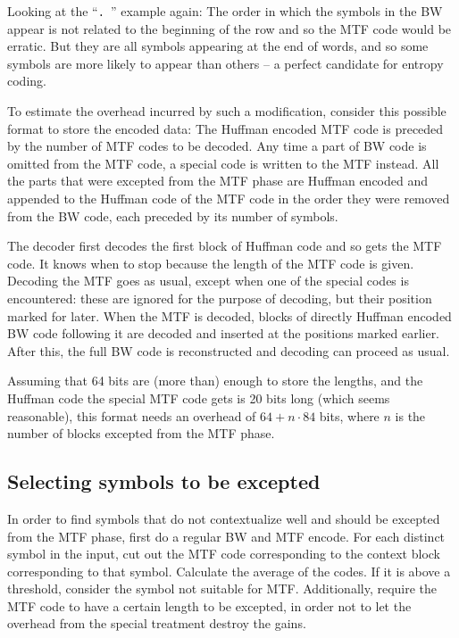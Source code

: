 \documentclass[a4paper]{scrreprt}
\begin{document}
Looking at the ``\texttt{. }'' example again: The order in which the symbols in
the BW appear is not related to the beginning of the row and so the MTF code
would be erratic. But they are all symbols appearing at the end of words, and so
some symbols are more likely to appear than others -- a perfect candidate for
entropy coding.

To estimate the overhead incurred by such a modification, consider this possible
format to store the encoded data: The Huffman encoded MTF code is preceded by
the number of MTF codes to be decoded. Any time a part of BW code is omitted
from the MTF code, a special code is written to the MTF instead. All the parts
that were excepted from the MTF phase are Huffman encoded and appended to the
Huffman code of the MTF code in the order they were removed from the BW code,
each preceded by its number of symbols.

The decoder first decodes the first block of Huffman code and so gets the MTF
code. It knows when to stop because the length of the MTF code is given.
Decoding the MTF goes as usual, except when one of the special codes is
encountered: these are ignored for the purpose of decoding, but their position
marked for later. When the MTF is decoded, blocks of directly Huffman encoded BW
code following it are decoded and inserted at the positions marked earlier.
After this, the full BW code is reconstructed and decoding can proceed as usual.

Assuming that 64 bits are (more than) enough to store the lengths, and the
Huffman code the special MTF code gets is 20 bits long (which seems reasonable),
this format needs an overhead of \(64 + n \cdot 84\) bits, where \(n\) is the
number of blocks excepted from the MTF phase.

\subsection{Selecting symbols to be excepted}

In order to find symbols that do not contextualize well and should be excepted
from the MTF phase, first do a regular BW and MTF encode. For each distinct
symbol in the input, cut out the MTF code corresponding to the context block
corresponding to that symbol. Calculate the average of the codes. If it is above
a threshold, consider the symbol not suitable for MTF. Additionally, require the
MTF code to have a certain length to be excepted, in order not to let the
overhead from the special treatment destroy the gains.
\end{document}
